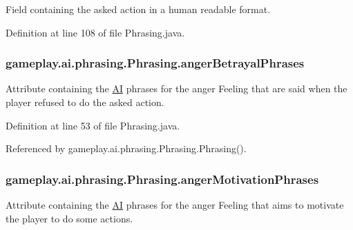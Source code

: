 Field containing the asked action in a human readable format. 



Definition at line 108 of file Phrasing.\-java.

\hypertarget{classgameplay_1_1ai_1_1phrasing_1_1_phrasing_a69df7c3975018f12a43f29172bbc5789}{
\subsubsection[{anger\-Betrayal\-Phrases}]{ gameplay.\-ai.\-phrasing.\-Phrasing.\-anger\-Betrayal\-Phrases\hspace{0.3cm}{\ttfamily [protected]}}}\label{classgameplay_1_1ai_1_1phrasing_1_1_phrasing_a69df7c3975018f12a43f29172bbc5789}


Attribute containing the \hyperlink{classgameplay_1_1ai_1_1_a_i}{A\-I} phrases for the anger Feeling that are said when the player refused to do the asked action. 



Definition at line 53 of file Phrasing.\-java.



Referenced by gameplay.\-ai.\-phrasing.\-Phrasing.\-Phrasing().

\hypertarget{classgameplay_1_1ai_1_1phrasing_1_1_phrasing_a2fb3c3c2b96efbc4afee915d58967130}{
\subsubsection[{anger\-Motivation\-Phrases}]{ gameplay.\-ai.\-phrasing.\-Phrasing.\-anger\-Motivation\-Phrases\hspace{0.3cm}{\ttfamily [protected]}}}\label{classgameplay_1_1ai_1_1phrasing_1_1_phrasing_a2fb3c3c2b96efbc4afee915d58967130}


Attribute containing the \hyperlink{classgameplay_1_1ai_1_1_a_i}{A\-I} phrases for the anger Feeling that aims to motivate the player to do some actions. 



